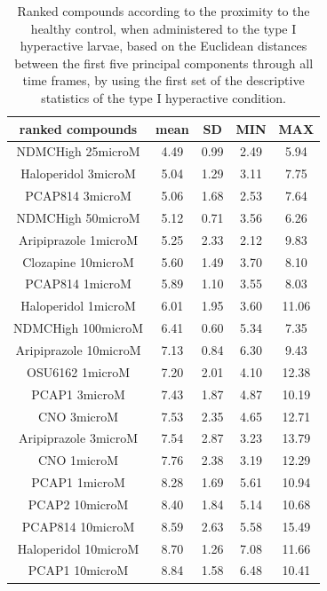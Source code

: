 \begin{table}[h!]\tiny
\centering
\caption{Ranked compounds according to the proximity to the healthy control, when administered to the type I hyperactive larvae, based on the Euclidean distances between the first five principal components through all time frames, by using the first set of the descriptive statistics of the type I hyperactive condition.}
\begin{tabular}{|c|c|c|c|c|}
\hline
ranked compounds             & mean & SD   & MIN  & MAX   \\ \hline
NDMCHigh 25microM     & 4.49  & 0.99  & 2.49 & 5.94  \\ \hline
Haloperidol 3microM   & 5.04  & 1.29  & 3.11 & 7.75  \\ \hline
PCAP814 3microM       & 5.06  & 1.68  & 2.53 & 7.64  \\ \hline
NDMCHigh 50microM     & 5.12  & 0.71  & 3.56 & 6.26  \\ \hline
Aripiprazole 1microM  & 5.25  & 2.33  & 2.12 & 9.83  \\ \hline
Clozapine 10microM    & 5.60   & 1.49  & 3.70  & 8.10   \\ \hline
PCAP814 1microM       & 5.89  & 1.10   & 3.55 & 8.03  \\ \hline
Haloperidol 1microM   & 6.01  & 1.95  & 3.60  & 11.06 \\ \hline
NDMCHigh 100microM    & 6.41  & 0.60   & 5.34 & 7.35  \\ \hline
Aripiprazole 10microM & 7.13  & 0.84  & 6.30  & 9.43  \\ \hline
OSU6162 1microM       & 7.20   & 2.01  & 4.10  & 12.38 \\ \hline
PCAP1 3microM         & 7.43  & 1.87  & 4.87 & 10.19 \\ \hline
CNO 3microM           & 7.53  & 2.35  & 4.65 & 12.71 \\ \hline
Aripiprazole 3microM  & 7.54  & 2.87  & 3.23 & 13.79 \\ \hline
CNO 1microM           & 7.76  & 2.38  & 3.19 & 12.29 \\ \hline
PCAP1 1microM         & 8.28  & 1.69  & 5.61 & 10.94 \\ \hline
PCAP2 10microM        & 8.40   & 1.84  & 5.14 & 10.68 \\ \hline
PCAP814 10microM      & 8.59  & 2.63  & 5.58 & 15.49 \\ \hline
Haloperidol 10microM  & 8.70   & 1.26  & 7.08 & 11.66 \\ \hline
PCAP1 10microM        & 8.84  & 1.58  & 6.48 & 10.41 \\ \hline

\end{tabular}
\end{table}
